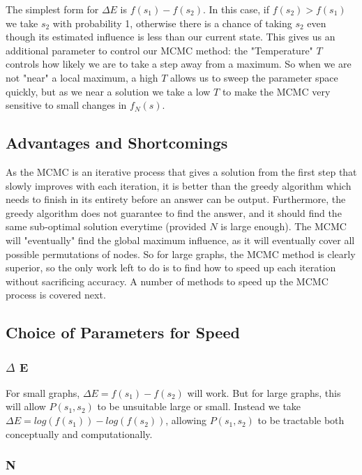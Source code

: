 \documentclass{article}
\begin{document}
		The simplest form for $\Delta E$ is $f(s_1) - f(s_2)$. In this case, if $f(s_2) > f(s_1)$ we take $s_2$ with probability 1, otherwise there is a chance of taking $s_2$ even though its estimated influence is less than our current state. This gives us an additional parameter to control our MCMC method: the "Temperature" $T$ controls how likely we are to take a step away from a maximum. So when we are not "near" a local maximum, a high $T$ allows us to sweep the parameter space quickly, but as we near a solution we take a low $T$ to make the MCMC very sensitive to small changes in $f_N(s)$.
	
	\subsection{Advantages and Shortcomings}
	
	As the MCMC is an iterative process that gives a solution from the first step that slowly improves with each iteration, it is better than the greedy algorithm which needs to finish in its entirety before an answer can be output. Furthermore, the greedy algorithm does not guarantee to find the answer, and it should find the same sub-optimal solution everytime (provided $N$ is large enough). The MCMC will "eventually" find the global maximum influence, as it will eventually cover all possible permutations of nodes. So for large graphs, the MCMC method is clearly superior, so the only work left to do is to find how to speed up each iteration without sacrificing accuracy. A number of methods to speed up the MCMC process is covered next.
	
	\subsection{Choice of Parameters for Speed}
	
	\subsubsection{$\Delta$ E}
	
	For small graphs, $\Delta E = f(s_1) - f(s_2)$ will work. But for large graphs, this will allow $P(s_1,s_2)$ to be unsuitable large or small. Instead we take $\Delta E = log(f(s_1)) - log(f(s_2))$, allowing $P(s_1,s_2)$ to be tractable both conceptually and computationally.
	
	\subsubsection{N}
	
\end{document}
